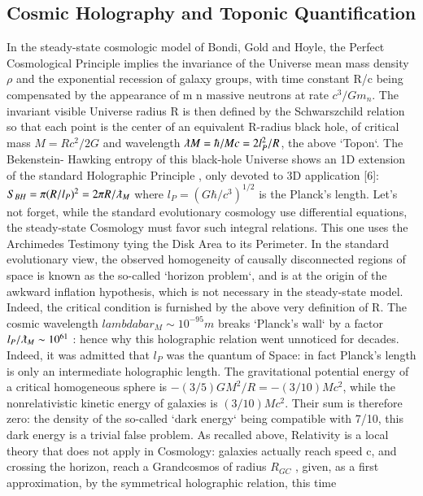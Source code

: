 \documentclass[twoside,draft]{article}
\begin{document}
\begin{sloppypar}
{\subsection{Cosmic Holography and Toponic Quantification}

In the steady-state cosmologic model of Bondi, Gold and Hoyle\cite{bondi}, the Perfect Cosmological
Principle implies the invariance of the Universe mean mass density $\rho$ and the exponential recession
of galaxy groups, with time constant R/c being compensated by the appearance of m n massive
neutrons at rate $c^{3} /Gm_{n}$. The invariant visible Universe radius R is then defined by the
Schwarszchild relation so that each point is the center of an equivalent R-radius black hole, of
critical mass $M = Rc^{2} /2G$ and wavelength $\lambdabar M = \hbar/Mc = 2l_{P}^{2} /R$, the above `Topon`. The Bekenstein-
Hawking entropy of this black-hole Universe shows an 1D extension of the standard Holographic
Principle , only devoted to 3D application \cite{bousso}[6]:
$S_{BH} = \pi(R/l_{P})^{2} = 2\pi R/\lambdabar_{M}$
where $l_{P} = (G\hbar/c^{3} )^{1/2}$ is the Planck's length. Let's not forget, while the standard evolutionary cosmology
use differential equations, the steady-state Cosmology must favor such integral relations. This one
uses the Archimedes Testimony tying the Disk Area to its Perimeter.
In the standard evolutionary view, the observed homogeneity of causally disconnected regions
of space is known as the so-called `horizon problem`, and is at the origin of the awkward inflation
hypothesis, which is not necessary in the steady-state model. Indeed, the critical condition is
furnished by the above very definition of R.
The cosmic wavelength
$lambdabar_{M} \sim 10^{-95} m$ breaks `Planck's wall` by a factor $l_{P} /\lambdabar_{M} \sim 10^{61}$ : hence why this holographic relation went unnoticed for decades. Indeed, it was admitted that $l_{P}$ was the quantum of Space: in fact Planck's length is only an intermediate holographic length.
The gravitational potential energy of a critical homogeneous sphere is $-(3/5)GM^{2}/R = -
(3/10)Mc^{2}$, while the nonrelativistic kinetic energy of galaxies is $(3/10)Mc^{2}$. Their sum is therefore
zero: the density of the so-called `dark energy` being compatible with 7/10, this dark energy is a
trivial false problem. As recalled above, Relativity is a local theory that does not apply in
Cosmology: galaxies actually reach speed c, and crossing the horizon, reach a Grandcosmos of
radius $R_{GC}$ , given, as a first approximation, by the symmetrical holographic relation, this time
}
\end{sloppypar}
\end{document}
